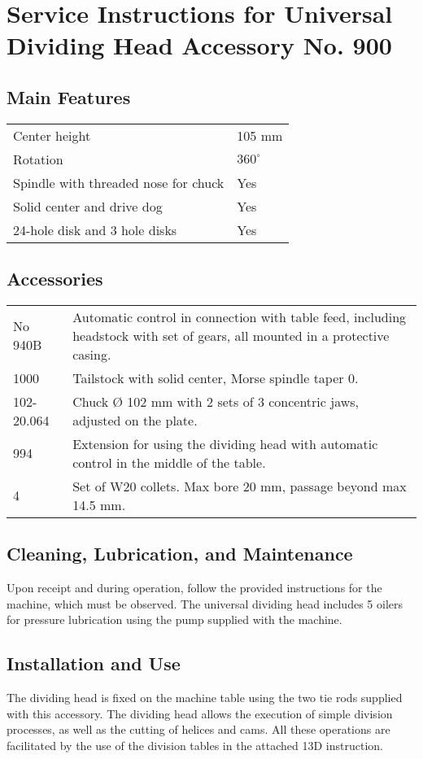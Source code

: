 \chapter{Service Instructions for Universal Dividing Head \small{Accessory No. 900}}

\section*{Main Features}
\begin{tabular}{@{}ll@{}}
    Center height                        & 105 mm        \\
    Rotation                             & \(360^\circ\) \\
    Spindle with threaded nose for chuck & Yes           \\
    Solid center and drive dog           & Yes           \\
    24-hole disk and 3 hole disks        & Yes           \\
\end{tabular}

\section*{Accessories}
\begin{tabular}{@{}ll@{}}
    No 940B    & Automatic control in connection with table feed, including headstock with set of gears, all mounted in a protective casing. \\
    1000       & Tailstock with solid center, Morse spindle taper 0.                                                                         \\
    102-20.064 & Chuck Ø 102 mm with 2 sets of 3 concentric jaws, adjusted on the plate.                                                     \\
    994        & Extension for using the dividing head with automatic control in the middle of the table.                                    \\
    4          & Set of W20 collets. Max bore 20 mm, passage beyond max 14.5 mm.                                                             \\
\end{tabular}

\section*{Cleaning, Lubrication, and Maintenance}
Upon receipt and during operation, follow the provided instructions for the machine, which must be observed.
The universal dividing head includes 5 oilers for pressure lubrication using the pump supplied with the machine.

\section*{Installation and Use}
The dividing head is fixed on the machine table using the two tie rods supplied with this accessory.
The dividing head allows the execution of simple division processes, as well as the cutting of helices and cams.
All these operations are facilitated by the use of the division tables in the attached 13D instruction.

